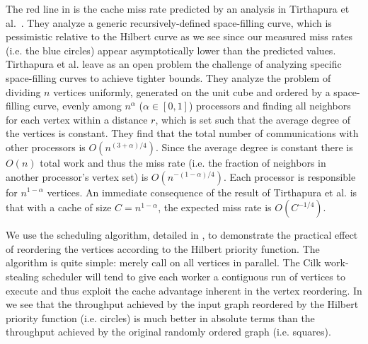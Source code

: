 The red line in 
is the cache miss rate predicted by an analysis in Tirthapura 
et al.~\cite{TirthapuraSeAl06}.  They analyze a generic recursively-defined
space-filling curve, which is pessimistic relative to the Hilbert curve
as we see since our measured miss rates (i.e. the blue circles) 
appear asymptotically lower than the predicted values.
Tirthapura et al. leave as an open problem 
the challenge of analyzing specific space-filling
curves to achieve tighter bounds.  They analyze the problem of 
dividing $n$ vertices uniformly, generated on the unit cube and 
ordered by a space-filling curve, evenly among $n^\alpha$ 
($\alpha \in [0,1]$) processors and 
finding all neighbors for each vertex within a distance $r$, which is
set such that the average degree of the vertices is constant.  They
find that the total number of communications with other processors is
$O(n^{(3+\alpha)/4})$.  Since the average degree is constant there is
$O(n)$ total work and thus the miss rate (i.e. the fraction of neighbors
in another processor's vertex set) is $O(n^{-(1-\alpha)/4})$.  Each
processor is responsible for $n^{1-\alpha}$ vertices.  An immediate
consequence of the result of Tirthapura et al. is that
with a cache of size $C=n^{1-\alpha}$, the expected miss rate
is $O(C^{-1/4})$.  


We use the  scheduling algorithm, detailed in
, to demonstrate the 
practical effect of reordering the vertices according to the
Hilbert priority function.  The  algorithm is quite
simple: merely call  on all vertices in parallel.
The Cilk work-stealing scheduler will tend to give each
worker a contiguous run of vertices to execute and thus exploit
the cache advantage inherent in the vertex reordering.  In 
 we see that the throughput achieved by
the input graph reordered by the Hilbert priority function 
(i.e. circles) is much better in absolute terms than the throughput
achieved by the original randomly ordered graph (i.e. squares).

